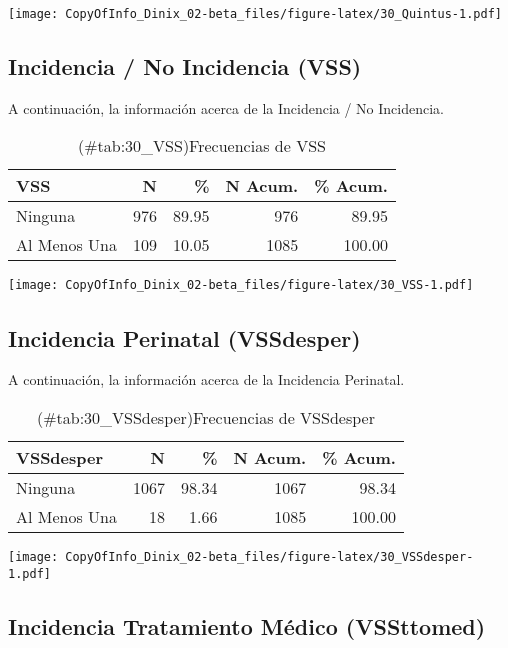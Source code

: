 \documentclass[
]{article}
\begin{document}
\texttt{[image: CopyOfInfo\_Dinix\_02-beta\_files/figure-latex/30\_Quintus-1.pdf]}

\subsection{Incidencia / No Incidencia (VSS)}\label{incidencia-no-incidencia-vss}

A continuación, la información acerca de la Incidencia / No Incidencia.

\begin{table}

\caption{(\#tab:30_VSS)Frecuencias de VSS}
\centering
\begin{tabular}[t]{lrrrr}
\toprule
VSS & N & \% & N Acum. & \% Acum.\\
\midrule
Ninguna & 976 & 89.95 & 976 & 89.95\\
Al Menos Una & 109 & 10.05 & 1085 & 100.00\\
\bottomrule
\end{tabular}
\end{table}

\texttt{[image: CopyOfInfo\_Dinix\_02-beta\_files/figure-latex/30\_VSS-1.pdf]}

\subsection{Incidencia Perinatal (VSSdesper)}\label{incidencia-perinatal-vssdesper}

A continuación, la información acerca de la Incidencia Perinatal.

\begin{table}

\caption{(\#tab:30_VSSdesper)Frecuencias de VSSdesper}
\centering
\begin{tabular}[t]{lrrrr}
\toprule
VSSdesper & N & \% & N Acum. & \% Acum.\\
\midrule
Ninguna & 1067 & 98.34 & 1067 & 98.34\\
Al Menos Una & 18 & 1.66 & 1085 & 100.00\\
\bottomrule
\end{tabular}
\end{table}

\texttt{[image: CopyOfInfo\_Dinix\_02-beta\_files/figure-latex/30\_VSSdesper-1.pdf]}

\subsection{Incidencia Tratamiento Médico (VSSttomed)}\label{incidencia-tratamiento-muxe9dico-vssttomed}
\end{document}
